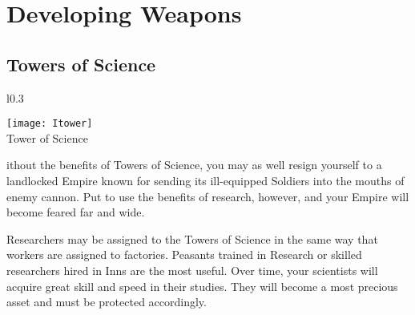 
\chapter{Developing Weapons}


\section{Towers of Science}


\begin{wrapfigure}{l}{0.3\textwidth}
	\vspace{-20pt}
	\begin{center}
		\texttt{[image: Itower]} %
		\\ Tower of Science
	\end{center}
	\vspace{-20pt}
\end{wrapfigure}


ithout the benefits of Towers of Science, you may as well resign yourself to a landlocked Empire known for sending its ill-equipped Soldiers into the mouths of enemy cannon. Put to use the benefits of research, however, and your Empire will become feared far and wide.

Researchers may be assigned to the Towers of Science in the same way that workers are assigned to factories. Peasants trained in Research or skilled researchers hired in Inns are the most useful. Over time, your scientists will acquire great skill and speed in their studies. They will become a most precious asset and must be protected accordingly.

